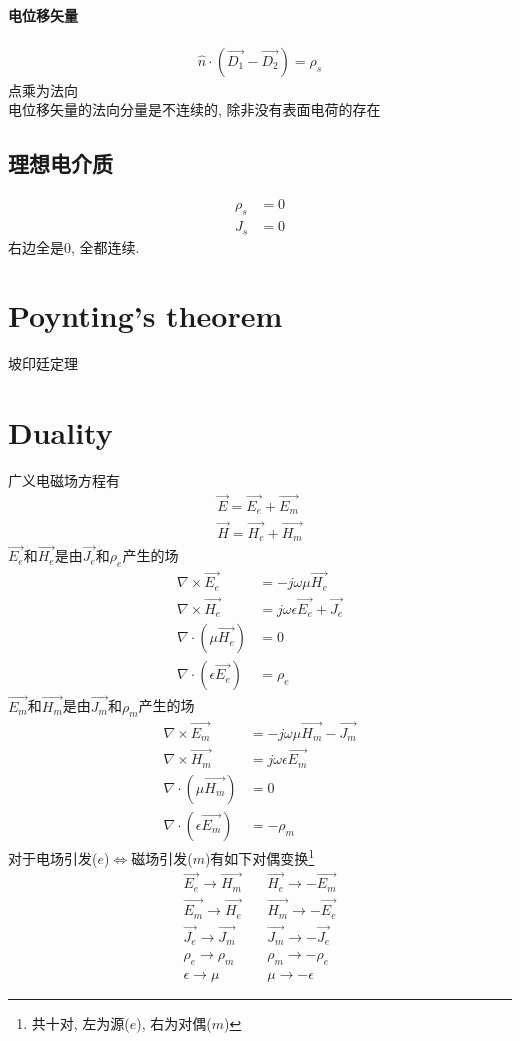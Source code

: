 \documentclass[a4paper]{report}
\begin{document}
\paragraph{电位移矢量}
\begin{align*}
  \hat{n}\cdot (\vec{D_1}-\vec{D_2})=\rho_s
\end{align*}
点乘为法向\\
电位移矢量的法向分量是不连续的, 除非没有表面电荷的存在
\subsection{理想电介质}
\begin{align*}
  \rho_s&=0
  \\ J_s&=0
\end{align*}
右边全是0, 全都连续. 

\section{Poynting's theorem}
坡印廷定理
\section{Duality}
广义电磁场方程有
\begin{align*}
  \vec{E}=\vec{E_e}+\vec{E_m}
  \\ \vec{H}=\vec{H_e}+\vec{H_m}
\end{align*}
$\vec{E_e}$和$\vec{H_e}$是由$\vec{J_e}$和$\rho_e$产生的场
\begin{align*}
  \nabla \times \vec{E_e}&=-j\omega\mu\vec{H_e}
  \\ \nabla \times \vec{H_e}&=j\omega\epsilon\vec{E_e}+\vec{J_e}
  \\ \nabla \cdot (\mu\vec{H_e})&=0
  \\ \nabla \cdot (\epsilon\vec{E_e})&=\rho_e
\end{align*}
$\vec{E_m}$和$\vec{H_m}$是由$\vec{J_m}$和$\rho_m$产生的场
\begin{align*}
  \nabla \times \vec{E_m}&=-j\omega\mu\vec{H_m}-\vec{J_m}
  \\ \nabla \times \vec{H_m}&=j\omega\epsilon\vec{E_m}
  \\ \nabla \cdot (\mu\vec{H_m})&=0
  \\ \nabla \cdot (\epsilon\vec{E_m})&=-\rho_m
\end{align*}
对于电场引发($e$)$\Leftrightarrow$磁场引发($m$)有如下对偶变换\footnote{共十对, 左为源($e$), 右为对偶($m$)}
\begin{align*}
  \vec{E_e}\rightarrow\vec{H_m}& \quad \vec{H_e}\rightarrow -\vec{E_m}
  \\ \vec{E_m}\rightarrow\vec{H_e}&\quad\vec{H_m}\rightarrow -\vec{E_e}
  \\ \vec{J_e}\rightarrow\vec{J_m}&\quad\vec{J_m}\rightarrow -\vec{J_e}
  \\ \rho_e\rightarrow\rho_m&\quad\rho_m\rightarrow -\rho_e
  \\ \epsilon\rightarrow\mu&\quad\mu\rightarrow -\epsilon
\end{align*}
\end{document}
